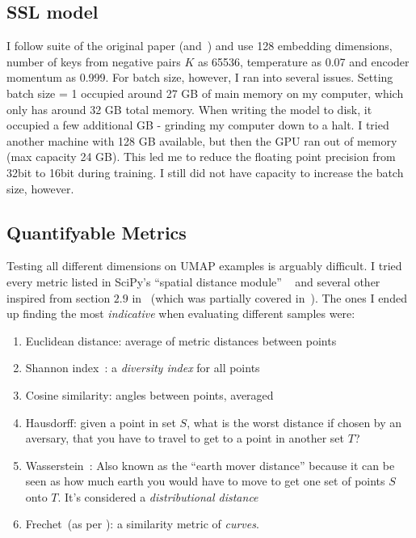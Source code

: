 \documentclass[10pt,twocolumn,letterpaper]{article}
\begin{document}
\subsection{SSL model}\label{subsec:mymodel}
I follow suite of the original paper (and~\cite{moco}) and use 128 embedding dimensions, number of keys from negative pairs $K$ as 65536, temperature as 0.07 and encoder momentum as 0.999. For batch size, however, I ran into several issues. Setting batch size = 1 occupied around 27 GB of main memory on my computer, which only has around 32 GB total memory. When writing the model to disk, it occupied a few additional GB - grinding my computer down to a halt. I tried another machine with 128 GB available, but then the \gls{GPU} ran out of memory (max capacity 24 GB). This led me to reduce the floating point precision from 32bit to 16bit during training. I still did not have capacity to increase the batch size, however.

\subsection{Quantifyable Metrics}\label{sec:quantifiable}
Testing all different dimensions on \gls{UMAP} examples is arguably difficult. I tried every metric listed in SciPy's ``spatial distance module'' ~\cite{scipy} and several other inspired from section $2.9$ in~\cite{datarepresentativity} (which was partially covered in~). The ones I ended up finding the most \textit{indicative} when evaluating different samples were:
\begin{enumerate}
  \item Euclidean distance: average of metric distances between points
  \item Shannon index~\cite{shannon1948mathematical}: a \textit{diversity index} for all points 
  \item Cosine similarity: angles between points, averaged
  \item Hausdorff: given a point in set $S$, what is the worst distance if chosen by an aversary, that you have to travel to get to a point in another set $T$?
  \item Wasserstein~\cite{vaserstein1969markov}: Also known as the ``earth mover distance'' because it can be seen as how much earth you would have to move to get one set of points $S$ onto $T$. It's considered a \textit{distributional distance}
  \item Frechet~(as per \cite{eiter1994computing}): a similarity metric of \textit{curves}.
\end{enumerate}
\end{document}

